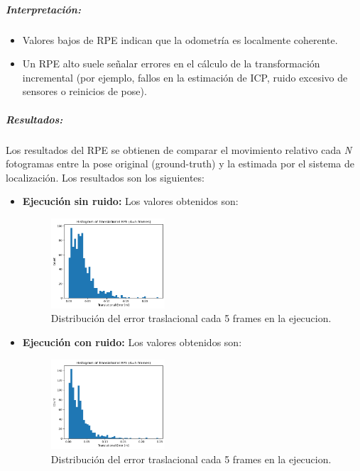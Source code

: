 \documentclass[12pt, a4paper, twoside]{article}
\begin{document}
\subparagraph{Interpretación:}
\begin{itemize}
  \item Valores bajos de RPE\cite{Sturm2012RPE} indican que la odometría es localmente coherente.
  \item Un RPE\cite{Sturm2012RPE} alto suele señalar errores en el cálculo de la transformación incremental 
  (por ejemplo, fallos en la estimación de ICP, ruido excesivo de sensores o reinicios de pose).
\end{itemize}

\subparagraph{Resultados:}
Los resultados del RPE\cite{Sturm2012RPE} se obtienen de comparar el movimiento relativo cada \textit{N} fotogramas entre la pose original (ground-truth) y la estimada por el sistema de localización. 
Los resultados son los siguientes:
\begin{itemize}
  \item \textbf{Ejecución sin ruido:} Los valores obtenidos son: \newline

  \begin{figure}[h]
    \centering
      \includegraphics[width=0.4\textwidth]{rpe_clean.png}
    \caption{Distribución del error traslacional cada 5 frames en la ejecucion.}
  \end{figure} 
  \newpage

  \item \textbf{Ejecución con ruido:} Los valores obtenidos son: \newline

  \begin{figure}[h]
    \centering
      \includegraphics[width=0.4\textwidth]{rpe_noisy.png}
    \caption{Distribución del error traslacional cada 5 frames en la ejecucion.}
  \end{figure} 

\end{itemize}
\end{document}
